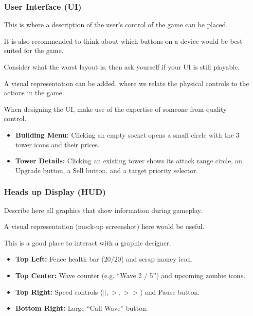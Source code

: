 \subsubsection{User Interface (UI)}

\begin{guidance}
This is where a description of the user’s control of the game can be placed.

It is also recommended to think about which buttons on a device would be best suited for the game.

Consider what the worst layout is, then ask yourself if your UI is still playable.

A visual representation can be added, where we relate the physical controls to the actions in the game.

When designing the UI, make use of the expertise of someone from quality control.
\end{guidance}
\begin{itemize}[label=\textbullet]
  \item \textbf{Building Menu:} Clicking an empty socket opens a small circle with the 3 tower icons and their prices.
  \item \textbf{Tower Details:} Clicking an existing tower shows its attack range circle, an Upgrade button, a Sell button, and a target priority selector.
\end{itemize}

\subsubsection{Heads up Display (HUD)}

\begin{guidance}
Describe here all graphics that show information during gameplay.

A visual representation (mock-up screenshot) here would be useful.

This is a good place to interact with a graphic designer.
\end{guidance}
\begin{itemize}[label=\textbullet]
  \item \textbf{Top Left:} Fence health bar ($20/20$) and scrap money icon.
  \item \textbf{Top Center:} Wave counter (e.g. ``Wave 2 / 5'') and upcoming zombie icons.
  \item \textbf{Top Right:} Speed controls ($||, >, >>$) and Pause button.
  \item \textbf{Bottom Right:} Large ``Call Wave'' button.
\end{itemize}

